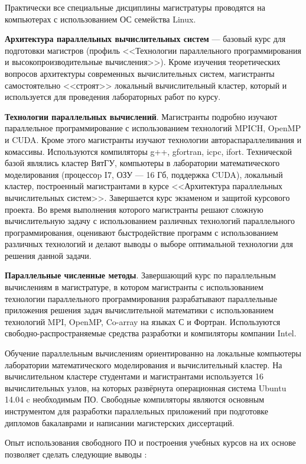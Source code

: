 \documentclass[10pt, a5paper]{article}
\begin{document}
Практически все специальные дисциплины магистратуры проводятся на компьютерах с использованием ОС семейства Linux.

\textbf{Архитектура параллельных вычислительных систем} --- базовый курс для подготовки магистров (профиль <<Технологии параллельного программирования и высокопроизводительные вычисления>>). Кроме изучения теоретических вопросов архитектуры современных вычислительных систем, магистранты самостоятельно <<строят>> локальный вычислительный кластер, который и используется для проведения лабораторных работ по курсу.

\textbf{Технологии параллельных вычислений}. Магистранты подробно изучают параллельное программирование с использованием технологий MPICH, OpenMP и CUDA. Кроме этого магистранты изучают технологии автораспараллеливания и комассивы. Используются компиляторы g++, gfortran, icpc, ifort. Технической базой являлись кластер ВятГУ, компьютеры в лаборатории математического моделирования (процессоp I7, ОЗУ --- 16 Гб, поддержка CUDA), локальный кластер, построенный магистрантами в курсе <<Архитектура параллельных вычислительных систем>>. Завершается курс экзаменом и защитой курсового проекта. Во время выполнения которого магистранты решают сложную вычислительную задачу с использованием различных технологий параллельного программирования, оценивают быстродействие программ с использованием различных технологий и делают выводы о выборе оптимальной технологии для решения данной задачи.

\textbf{Параллельные численные методы}. Завершающий курс по параллельным вычислениям в магистратуре, в котором магистранты с использованием технологии параллельного программирования разрабатывают параллельные приложения решения задач вычислительной математики с использованием технологий MPI, OpenMP, Co-array на языках С и Фортран. Используются свободно-распро\-страняемые средства разработки и компиляторы компании Intel.

Обучение параллельным вычислениям ориентированно на локальные компьютеры лаборатории математического моделирования и вычислительный кластер. На вычислительном кластере студентами и магистрантами используется 16 вычислительных узлов, на которых развёрнута операционная система Ubuntu 14.04 c необходимым ПО. Свободные компиляторы являются основным инструментом для разработки параллельных приложений при подготовке дипломов бакалаврами и написании магистерских диссертаций.

Опыт использования свободного ПО и построения учебных курсов на их основе позволяет сделать следующие выводы \cite{bib2}:
\end{document}
